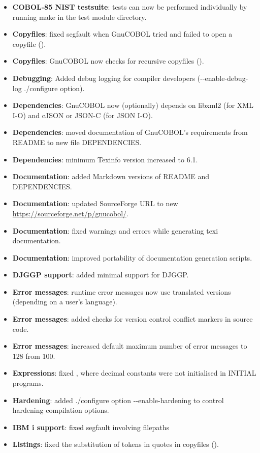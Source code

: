 \begin{itemize}
\item \textbf{COBOL-85 NIST testsuite}: tests can now be performed individually by running make in the test module directory.
\item \textbf{Copyfiles}: fixed segfault when GnuCOBOL tried and failed to open a copyfile ().
\item \textbf{Copyfiles}: GnuCOBOL now checks for recursive copyfiles ().
\item \textbf{Debugging}: Added debug logging for compiler developers (-{}-enable-debug-log ./configure option).
\item \textbf{Dependencies}: GnuCOBOL now (optionally) depends on libxml2 (for XML I-O) and cJSON or JSON-C (for JSON I-O).
\item \textbf{Dependencies}: moved documentation of GnuCOBOL's requirements from README to new file DEPENDENCIES.
\item \textbf{Dependencies}: minimum Texinfo version increased to 6.1.
\item \textbf{Documentation}: added Markdown versions of README and DEPENDENCIES.
\item \textbf{Documentation}: updated SourceForge URL to new \url{https://sourceforge.net/p/gnucobol/}.
\item \textbf{Documentation}: fixed warnings and errors while generating texi documentation.
\item \textbf{Documentation}: improved portability of documentation generation scripts.
\item \textbf{DJGGP support}: added minimal support for DJGGP.
\item \textbf{Error messages}: runtime error messages now use translated versions (depending on a user's language).
\item \textbf{Error messages}: added checks for version control conflict markers in source code.
\item \textbf{Error messages}: increased default maximum number of error messages to 128 from 100.
\item \textbf{Expressions}: fixed , where decimal constants were not initialised in INITIAL programs.
\item \textbf{Hardening}: added ./configure option -{}-enable-hardening to control hardening compilation options.
\item \textbf{IBM i support}: fixed segfault involving filepaths
\item \textbf{Listings}: fixed the substitution of tokens in quotes in copyfiles ().

\end{itemize}
